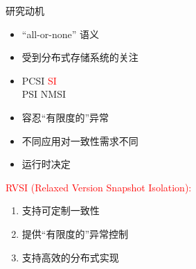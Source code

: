 \begin{frame}{研究动机}
  \vspace{0.30cm}

  \begin{description}
    \setlength{\itemsep}{5pt}
    \item[分布式事务:] 
      \begin{itemize}
        \item ``all-or-none'' 语义
        \item 受到分布式存储系统的关注 
      \end{itemize}
    \item[弱一致性:] 
      \begin{itemize}
        \item PCSI  \textcolor{red}{SI}  \\
          PSI  NMSI  
        \end{itemize}
    \pause
    \item[\question{异常控制}:]
      \begin{itemize}
        \item 容忍``有限度的''异常 
      \end{itemize}
    \item[\question{可定制}:] 
      \begin{itemize}
        \item 不同应用对一致性需求不同 
        \item 运行时决定 
      \end{itemize}
  \end{description}
 
  \pause
  \vspace{0.30cm}
  \textcolor{red}{RVSI (Relaxed Version Snapshot Isolation):}
  \begin{enumerate}
    \item 支持可定制一致性 
    \item 提供``有限度的''异常控制 
    \item 支持高效的分布式实现
  \end{enumerate}
\end{frame}


